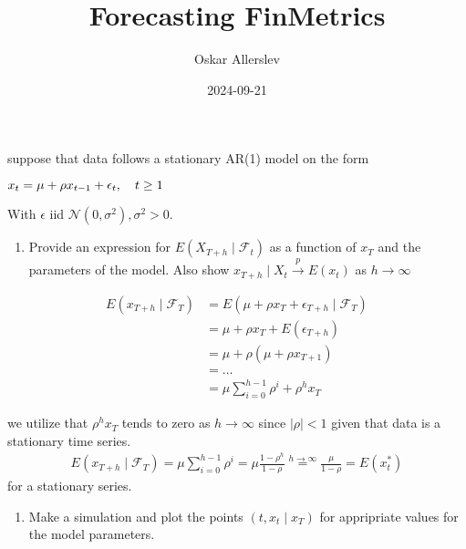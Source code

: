 \documentclass[
]{article}
\title{Forecasting FinMetrics}
\author{Oskar Allerslev}
\date{2024-09-21}
\providecommand{\tightlist}{%
  \setlength{\itemsep}{0pt}\setlength{\parskip}{0pt}}
\begin{document}
\maketitle

suppose that data follows a stationary AR(1) model on the form

\(x_t = \mu + \rho x_{t-1}+\epsilon_t, \hspace{0,35cm} t\geq 1\)

With \(\epsilon\) iid \(\mathcal{N}(0,\sigma^2), \sigma^2 > 0\).

\begin{enumerate}
\def\labelenumi{\arabic{enumi}.}
\tightlist
\item
  Provide an expression for \(E(X_{T+h} \mid \mathcal{F}_t)\) as a
  function of \(x_T\) and the parameters of the model. Also show
  \(x_{T+h} \mid X_{t} \overset{p}{\rightarrow} E(x_t)\) as
  \(h \rightarrow \infty\)
\end{enumerate}

\[
\begin{align*}
E(x_{T+h} \mid \mathcal{F}_T) &= E(\mu + \rho x_{T}+\epsilon_{T+h} \mid \mathcal{F}_T) \\
&=\mu + \rho x_{T} + E(\epsilon_{T+h})\\
&=\mu +\rho(\mu + \rho x_{T+1}) \\
&= \dots \\
&=\mu \sum_{i=0}^{h-1}\rho^i + \rho^h x_T
\end{align*}
\]

we utilize that \(\rho^h x_{T}\) tends to zero as
\(h \rightarrow \infty\) since \(\mid \rho \mid < 1\) given that data is
a stationary time series. \[
\begin{align*}
E(x_{T+h} \mid \mathcal{F}_T) =\mu \sum_{i=0}^{h-1} \rho^i= \mu\frac{1-\rho^h}{1-\rho} \overset{h \rightarrow \infty}{=} \frac{\mu}{1-\rho} = E(x_t^*) 
\end{align*}
\] for a stationary series.

\begin{enumerate}
\def\labelenumi{\arabic{enumi}.}
\setcounter{enumi}{1}
\tightlist
\item
  Make a simulation and plot the points \((t, x_t \mid x_{T})\) for
  appripriate values for the model parameters.
\end{enumerate}
\end{document}
